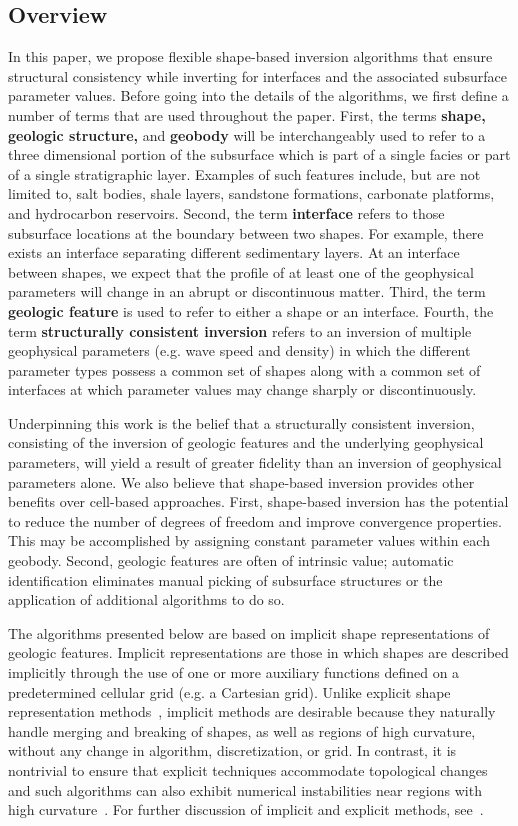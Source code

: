 \documentclass[manuscript,revised]{geophysics}
\begin{document}
\subsection{Overview}
In this paper, we propose flexible shape-based inversion algorithms that ensure structural consistency while inverting for interfaces and the associated subsurface parameter values.  Before going into the details of the algorithms, we first define a number of terms that are used throughout the paper.  First, the terms \textbf{shape, geologic structure,} and \textbf{geobody} will be interchangeably used to refer to a three dimensional portion of the subsurface which is part of a single facies or part of a single stratigraphic layer.  Examples of such features include, but are not limited to, salt bodies, shale layers, sandstone formations, carbonate platforms, and hydrocarbon reservoirs.  Second, the term \textbf{interface} refers to those subsurface locations at the boundary between two shapes.  For example, there exists an interface separating different sedimentary layers.  At an interface between shapes, we expect that the profile of at least one of the geophysical parameters will change in an abrupt or discontinuous matter.  Third, the term \textbf{geologic feature} is used to refer to either a shape or an interface.  Fourth, the term \textbf{structurally consistent inversion} refers to an inversion of multiple geophysical parameters (e.g. wave speed and density) in which the different parameter types possess a common set of shapes along with a common set of interfaces at which parameter values may change sharply or discontinuously. 

Underpinning this work is the belief that a structurally consistent inversion, consisting of the inversion of geologic features and the underlying geophysical parameters, will yield a result of greater fidelity than an inversion of geophysical parameters alone.  We also believe that shape-based inversion provides other benefits over cell-based approaches.  First, shape-based inversion has the potential to reduce the number of degrees of freedom and improve convergence properties.  This may be accomplished by assigning constant parameter values within each geobody.   Second, geologic features are often of intrinsic value; automatic identification eliminates manual picking of subsurface structures or the application of additional algorithms to do so.

The algorithms presented below are based on implicit shape representations of geologic features.  Implicit representations are those in which shapes are described implicitly through the use of one or more auxiliary functions defined on a predetermined cellular grid (e.g. a Cartesian grid). Unlike explicit shape representation methods~\cite[]{Galley20}, implicit methods are desirable because they naturally handle merging and breaking of shapes, as well as regions of high curvature, without any change in algorithm, discretization, or grid.   In contrast, it is nontrivial to ensure that explicit techniques accommodate topological changes and such algorithms can also exhibit numerical instabilities near regions with high curvature~\cite[]{Abubakar_2009}.  For further discussion of implicit and explicit methods, see~\cite{Osher_1988}.
\end{document}
